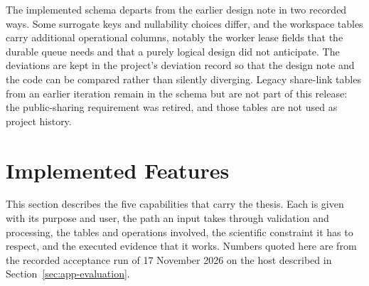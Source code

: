 The implemented schema departs from the earlier design note in two recorded ways. Some surrogate
keys and nullability choices differ, and the workspace tables carry additional operational columns,
notably the worker lease fields that the durable queue needs and that a purely logical design did not
anticipate. The deviations are kept in the project's deviation record so that the design note and the
code can be compared rather than silently diverging. Legacy share-link tables from an earlier
iteration remain in the schema but are not part of this release: the public-sharing requirement was
retired, and those tables are not used as project history.

\section{Implemented Features}\label{sec:app-features}
This section describes the five capabilities that carry the thesis. Each is given with its purpose
and user, the path an input takes through validation and processing, the tables and operations
involved, the scientific constraint it has to respect, and the executed evidence that it works.
Numbers quoted here are from the recorded acceptance run of 17 November 2026 on the host described
in Section~\ref{sec:app-evaluation}.

